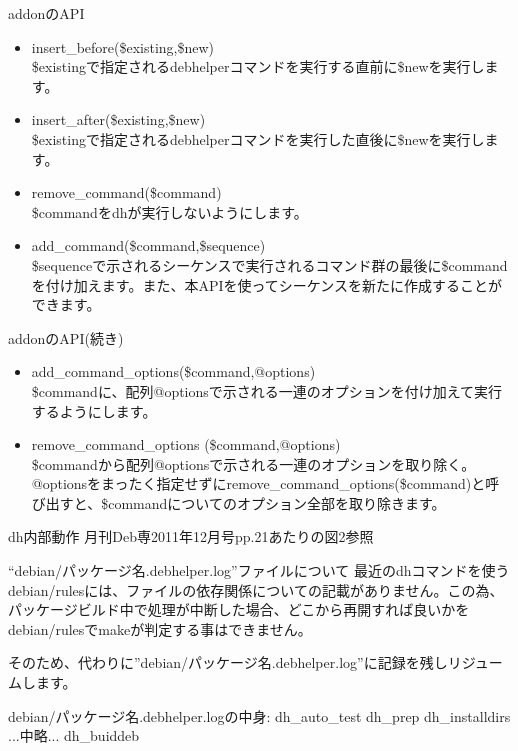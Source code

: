 \begin{frame}{addonのAPI}
\begin{itemize}
\item insert\_before(\$existing,\$new) \\
 \$existingで指定されるdebhelperコマンドを実行する直前に\$newを実行します。
\item insert\_after(\$existing,\$new) \\
\$existingで指定されるdebhelperコマンドを実行した直後に\$newを実行します。
\item remove\_command(\$command) \\
\$commandをdhが実行しないようにします。
\item add\_command(\$command,\$sequence) \\
\$sequenceで示されるシーケンスで実行されるコマンド群の最後に\$commandを付け加えます。また、本APIを使ってシーケンスを新たに作成することができます。
\end{itemize}
\end{frame}
\begin{frame}{addonのAPI(続き)}
\begin{itemize}
\item add\_command\_options(\$command,@options) \\
\$commandに、配列@optionsで示される一連のオプションを付け加えて実行するようにします。
\item remove\_command\_options (\$command,@options) \\
\$commandから配列@optionsで示される一連のオプションを取り除く。
@optionsをまったく指定せずにremove\_command\_options(\$command)と呼び出すと、\$commandについてのオプション全部を取り除きます。
\end{itemize}
\end{frame}

\begin{frame}{dh内部動作}
月刊Deb専2011年12月号pp.21あたりの図2参照
\end{frame}
\begin{frame}[containsverbatim]{``debian/パッケージ名.debhelper.log''ファイルについて}
最近のdhコマンドを使うdebian/rulesには、ファイルの依存関係についての記載がありません。この為、パッケージビルド中で処理が中断した場合、どこから再開すれば良いかをdebian/rulesでmakeが判定する事はできません。

そのため、代わりに''debian/パッケージ名.debhelper.log''に記録を残しリジュームします。
\begin{commandline}
debian/パッケージ名.debhelper.logの中身:
dh_auto_test
dh_prep
dh_installdirs
...中略...
dh_buiddeb
\end{commandline}
\end{frame}

